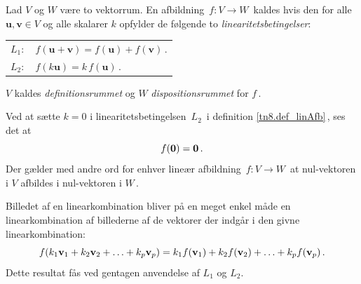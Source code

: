\begin{definition}\label{tn8.def_linAfb}
Lad $V$ og $W$ være to vektorrum. En afbildning $\,f:V\rightarrow W\,$ kaldes  hvis den for alle $\mathbf u,\mathbf v \in V$ og alle skalarer $k$ opfylder de følgende to \textit{linearitetsbetingelser}:\bs
\begin{tabular}{ll}
$L_1:$&$f(\mathbf u + \mathbf v)=f(\mathbf u) + f(\mathbf v)\,.$\\
$L_2:$&$f(k\mathbf u)=k\, f(\mathbf u)\,.$
\end{tabular}\bs
$V$ kaldes \textit{definitionsrummet} og $W$ \textit{dispositionsrummet} for $f\,$.
\end{definition}
\begin{aha}
Ved at sætte $k=0$ i linearitetsbetingelsen $\,L_2\,$ i definition \ref{tn8.def_linAfb}\,, ses det at
\begin{equation}
f(\bm{0})=\bm{0}\,.
\end{equation}
Der gælder med andre ord for enhver lineær afbildning $\,f:V\rightarrow W\,$ at nul-vektoren i $V$ afbildes i nul-vektoren i $W\,$.
\end{aha}
\begin{aha}
Billedet af en linearkombination bliver på en meget enkel måde en linearkombination af billederne af de vektorer der indgår i den givne linearkombination:
\begin{equation}\label{tn8.billedLinkomb}
f(k_1\mathbf{v}_1+k_2\mathbf{v}_2+\ldots+k_p\mathbf{v}_p)=
k_1f(\mathbf{v}_1)+k_2f(\mathbf{v}_2)+\ldots+k_pf(\mathbf{v}_p)\,.
\end{equation}
Dette resultat fås ved gentagen anvendelse af $L_1$ og $L_2$.
\end{aha}

